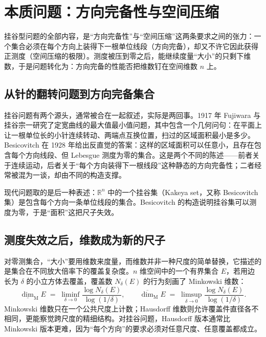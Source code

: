 \section{本质问题：方向完备性与空间压缩}

\begin{keybox}[本质问题]
挂谷型问题的全部内容，是“方向完备性”与“空间压缩”这两条要求之间的张力：一个集合必须在每个方向上装得下一根单位线段（方向完备），却又不许它因此获得正测度（空间压缩的极限）。测度被压到零之后，能继续度量“大小”的只剩下维数，于是问题转化为：方向完备的性能否把维数钉在空间维数 $n$ 上。
\end{keybox}

\subsection{从针的翻转问题到方向完备集合}

挂谷问题有两个源头，通常被合在一起叙述，实际是两回事。1917 年 Fujiwara 与挂谷宗一研究了定宽曲线的最大值最小值问题，其中包含一个几何问句：在平面上让一根单位长的小针连续转动、两端点互换位置，扫过的区域面积最小是多少。Besicovitch 在 1928 年给出反直觉的答案：这样的区域面积可以任意小，且存在包含每个方向线段、但 Lebesgue 测度为零的集合。这是两个不同的陈述——前者关于连续运动，后者关于“每个方向装得下一根线段”这种静态的方向完备性；二者经常被混为一谈，却由不同的构造支撑。

现代问题取的是后一种表述：$\mathbb{R}^n$ 中的一个挂谷集（Kakeya set，又称 Besicovitch 集）是包含每个方向一条单位线段的集合。Besicovitch 的构造说明挂谷集可以测度为零，于是“面积”这把尺子失效。

\subsection{测度失效之后，维数成为新的尺子}

对零测集合，“大小”要用维数来度量，而维数并非一种尺度的简单替换，它描述的是集合在不同放大倍率下的覆盖复杂度。$n$ 维空间中的一个有界集合 $E$，若用边长为 $\delta$ 的小立方体去覆盖，覆盖数 $N_\delta(E)$ 的行为刻画了 Minkowski 维数：
\begin{equation}
\underline{\dim}_{\mathrm{M}} E \;=\; \liminf_{\delta\to 0}\frac{\log N_\delta(E)}{\log (1/\delta)},\qquad
\overline{\dim}_{\mathrm{M}} E \;=\; \limsup_{\delta\to 0}\frac{\log N_\delta(E)}{\log (1/\delta)}.
\end{equation}
Minkowski 维数只在一个公共尺度上计数；Hausdorff 维数则允许覆盖件直径各不相同，更能察觉跨尺度的精细结构。对挂谷问题，Hausdorff 版本通常比 Minkowski 版本更难，因为“每个方向”的要求必须对任意尺度、任意覆盖都成立。

